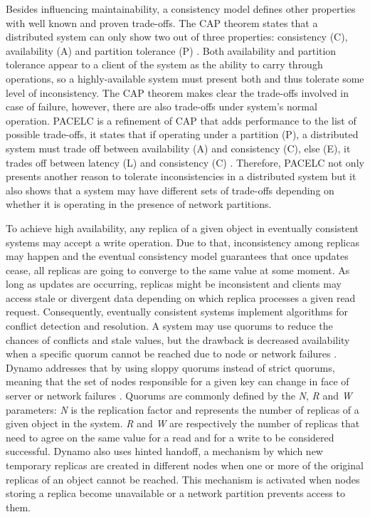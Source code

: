 \documentclass[man,floatsintext,12pt]{apa6}
\begin{document}
Besides influencing maintainability, a consistency model defines other
properties with well known and proven trade-offs. The CAP theorem states that a
distributed system can only show two out of three properties: consistency (C),
availability (A) and partition tolerance (P) \parencite{Brewer2000,Gilbert2002}.
Both availability and partition tolerance appear to a client of the system as
the ability to carry through operations, so a highly-available system must
present both and thus tolerate some level of inconsistency. The CAP theorem
makes clear the trade-offs involved in case of failure, however, there are also
trade-offs under system's normal operation. PACELC is a refinement of CAP that
adds performance to the list of possible trade-offs, it states that if
operating under a partition (P), a distributed system must trade off between
availability (A) and consistency (C), else (E), it trades off between latency
(L) and consistency (C) \parencite{Abadi2012}. Therefore, PACELC not only
presents another reason to tolerate inconsistencies in a distributed system but 
it also shows that a system may have different sets of trade-offs depending on
whether it is operating in the presence of network partitions.

To achieve high availability, any replica of a given object in eventually
consistent systems may accept a write operation. Due to that, inconsistency
among replicas may happen and the eventual consistency model guarantees that
once updates cease, all replicas are going to converge to the same value at
some moment. As long as updates are occurring, replicas might be inconsistent
and clients may access stale or divergent data depending on which replica
processes a given read request. Consequently, eventually consistent systems
implement algorithms for conflict detection and resolution. A system may use
quorums to reduce the chances of conflicts and stale values, but the drawback
is decreased availability when a specific quorum cannot be reached due to node
or network failures \parencite{Vogels2009}. Dynamo addresses that by using
sloppy quorums instead of strict quorums, meaning that the set of nodes
responsible for a given key can change in face of server or network failures
\parencite{DeCandia2007}.  Quorums are commonly defined by the \textit{N},
\textit{R} and \textit{W} parameters: \textit{N} is the replication factor and
represents the number of replicas of a given object in the system. \textit{R}
and \textit{W} are respectively the number of replicas that need to agree on
the same value for a read and for a write to be considered successful. Dynamo
also uses hinted handoff, a mechanism by which new temporary replicas are
created in different nodes when one or more of the original replicas of an
object cannot be reached.  This mechanism is activated when nodes storing a
replica become unavailable or a network partition prevents access to them.
\end{document}
